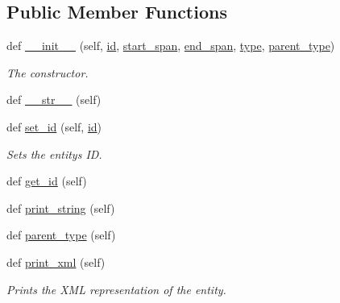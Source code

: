 \subsection*{Public Member Functions}
\begin{DoxyCompactItemize}
\item 
def \hyperlink{classtask6_1_1t6Entities_1_1T6Entity_acd7eefda53a955f5a2e2c33331377845}{\+\_\+\+\_\+init\+\_\+\+\_\+} (self, \hyperlink{classtask6_1_1t6Entities_1_1T6Entity_afeeced8134bb3ebe0cfecc64d0ab46a4}{id}, \hyperlink{classtask6_1_1t6Entities_1_1T6Entity_a52779e9af8864dc98e8b02fc5b9b041a}{start\+\_\+span}, \hyperlink{classtask6_1_1t6Entities_1_1T6Entity_aeb402200b156cd9562c5111dfe777b98}{end\+\_\+span}, \hyperlink{classtask6_1_1t6Entities_1_1T6Entity_ae4299399be3ecbd68dbb9ae988bff5a8}{type}, \hyperlink{classtask6_1_1t6Entities_1_1T6Entity_a2e9b6dc858c26a85ad740ad7e1bfda67}{parent\+\_\+type})
\begin{DoxyCompactList}\small\item\em The constructor. \end{DoxyCompactList}\item 
def \hyperlink{classtask6_1_1t6Entities_1_1T6Entity_a4fe9419bea53693abf1b475c88ed5494}{\+\_\+\+\_\+str\+\_\+\+\_\+} (self)
\item 
def \hyperlink{classtask6_1_1t6Entities_1_1T6Entity_aae04121cb00d82840741e39cf0da5706}{set\+\_\+id} (self, \hyperlink{classtask6_1_1t6Entities_1_1T6Entity_afeeced8134bb3ebe0cfecc64d0ab46a4}{id})
\begin{DoxyCompactList}\small\item\em Sets the entity\textquotesingle{}s ID. \end{DoxyCompactList}\item 
def \hyperlink{classtask6_1_1t6Entities_1_1T6Entity_a3b9262436cde3e62dd006ab4986961e1}{get\+\_\+id} (self)
\item 
def \hyperlink{classtask6_1_1t6Entities_1_1T6Entity_a5b8a42787e0d8c65840e69c56eaeeb93}{print\+\_\+string} (self)
\item 
def \hyperlink{classtask6_1_1t6Entities_1_1T6Entity_a3463d49b756cd711c82ce3505521e3ff}{parent\+\_\+type} (self)
\item 
def \hyperlink{classtask6_1_1t6Entities_1_1T6Entity_aadc043ccba4eb2b57cb9ac365dc7dbfe}{print\+\_\+xml} (self)
\begin{DoxyCompactList}\small\item\em Prints the X\+ML representation of the entity. \end{DoxyCompactList}\end{DoxyCompactItemize}
